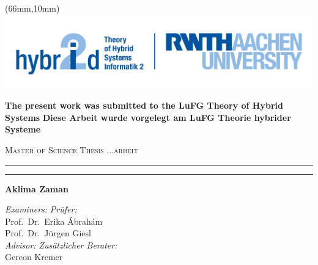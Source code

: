 

\begin{titlepage}

\begin{center}



	\begin{textblock*}{1mm}(66mm,10mm)%
		\includegraphics[height=32mm]{./logo_ths.png}
	\end{textblock*}
	\fontsize{14pt}{16}\selectfont
	\ifenglish\noindent \textbf{The present work was submitted to the LuFG Theory of Hybrid Systems}
	\else\noindent\textbf{Diese Arbeit wurde vorgelegt am LuFG Theorie hybrider Systeme}\fi 

\medskip
\vspace*{2cm}

\ifenglish\textsc{\Large Master of Science Thesis}
\else\textsc{\Large ...arbeit}\fi \\[0.5cm]


\hrule \par\bigskip
{ \huge \begin{spacing}{1.1}  \end{spacing} }
\par\bigskip
\hrule \par\bigskip
\large{\textbf{Aklima Zaman} \\
}
\vfill \vfill \vfill \vfill
\begin{minipage}[b]{0.65\textwidth}
 \large
\ifenglish\emph{Examiners:}
\else\emph{Pr\"ufer:}\fi \\
Prof.~Dr.~Erika \'Abrah\'am \\
Prof.~Dr.~Jürgen Giesl \\

\ifenglish\emph{Advisor:}
\else\emph{Zus\"atzlicher Berater:} \fi\\
Gereon Kremer\\



\end{minipage}
\end{center}
\end{titlepage}
